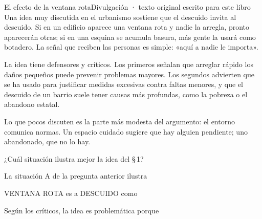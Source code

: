 \evaluacion
\begin{texto}{El efecto de la ventana rota}{Divulgación · texto original escrito para este libro}
\pa Una idea muy discutida en el urbanismo sostiene que el descuido invita al descuido. Si en un edificio aparece una
ventana rota y nadie la arregla, pronto aparecerán otras; si en una esquina se acumula basura, más gente la usará como
botadero. La señal que reciben las personas es simple: «aquí a nadie le importa».

\pa La idea tiene defensores y críticos. Los primeros señalan que arreglar rápido los daños pequeños puede prevenir
problemas mayores. Los segundos advierten que se ha usado para justificar medidas excesivas contra faltas menores, y que
el descuido de un barrio suele tener causas más profundas, como la pobreza o el abandono estatal.

\pa Lo que pocos discuten es la parte más modesta del argumento: el entorno comunica normas. Un espacio cuidado sugiere
que hay alguien pendiente; uno abandonado, que no lo hay.
\end{texto}
\begin{ejercicios}
\item ¿Cuál situación ilustra mejor la idea del \S\,1?
\item La situación A de la pregunta anterior ilustra
\item VENTANA ROTA es a DESCUIDO como
\item Según los críticos, la idea es problemática porque
\end{ejercicios}
